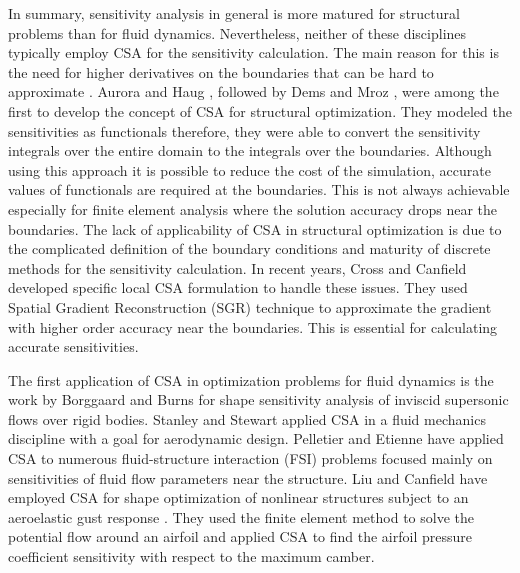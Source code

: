 In summary, sensitivity analysis in general is more matured for structural problems than for fluid dynamics. Nevertheless, neither of these disciplines typically employ CSA for the sensitivity calculation. The main reason for this is the need for higher derivatives on the boundaries that can be hard to approximate \cite{cross2014local}. Aurora and Haug \cite{Arora}, followed by Dems and Mroz \cite{Dems-Mroz}, were among the first to develop the concept of CSA for structural optimization. They modeled the sensitivities as functionals therefore, they were able to convert the sensitivity integrals over the entire domain to the integrals over the boundaries. Although using this approach it is possible to reduce the cost of the simulation, accurate values of functionals are required at the boundaries. This is not always achievable especially for finite element analysis where the solution accuracy drops near the boundaries. The lack of applicability of CSA in structural optimization is due to the complicated definition of the boundary conditions and maturity of discrete methods for the sensitivity calculation. In recent years, Cross and Canfield \cite{cross2014local} developed specific local CSA formulation to handle these issues. They used Spatial Gradient Reconstruction (SGR) technique to approximate the gradient with higher order accuracy near the boundaries. This is essential for calculating accurate sensitivities.

The first application of CSA in optimization problems for fluid dynamics is the work by Borggaard and Burns \cite{borggaard1995sensitivity} for shape sensitivity analysis of inviscid supersonic flows over rigid bodies. Stanley and Stewart \cite{stanley2002design} applied CSA in a fluid mechanics discipline with a goal for aerodynamic design. Pelletier and Etienne have applied CSA to numerous fluid-structure interaction (FSI) problems \cite{etienne2005general} focused mainly on sensitivities of fluid flow parameters near the structure. Liu and Canfield have employed CSA for shape optimization of nonlinear structures subject to an aeroelastic gust response \cite{liu2013equivalence}. They used the finite element method to solve the potential flow around an airfoil and applied CSA to find the airfoil pressure coefficient sensitivity with respect to the maximum camber. 

